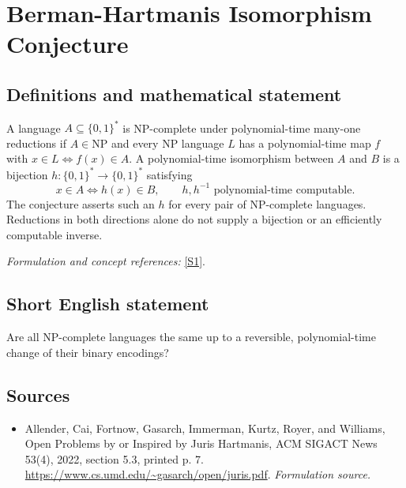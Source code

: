 \documentclass[11pt]{article}
\begin{document}
\section*{\texorpdfstring{Berman-Hartmanis Isomorphism Conjecture}{Berman-Hartmanis Isomorphism Conjecture}}\label{statement}
\subsection{Definitions and mathematical statement}
A language $A\subseteq\{0,1\}^*$ is NP-complete under polynomial-time many-one reductions if $A\in\mathrm{NP}$ and every NP language $L$ has a polynomial-time map $f$ with $x\in L\iff f(x)\in A$. A polynomial-time isomorphism between $A$ and $B$ is a bijection $h:\{0,1\}^*\to\{0,1\}^*$ satisfying
\[
 x\in A\iff h(x)\in B,
 \qquad h,h^{-1}\text{ polynomial-time computable}.
\]
The conjecture asserts such an $h$ for every pair of NP-complete languages. Reductions in both directions alone do not supply a bijection or an efficiently computable inverse.
\par\smallskip\textit{Formulation and concept references:} \href{https://www.cs.umd.edu/~gasarch/open/juris.pdf}{[S1]}.

\subsection{Short English statement}
Are all NP-complete languages the same up to a reversible, polynomial-time change of their binary encodings?
\subsection{Sources}
\begin{itemize}
\item[S1]Allender, Cai, Fortnow, Gasarch, Immerman, Kurtz, Royer, and Williams, Open Problems by or Inspired by Juris Hartmanis, ACM SIGACT News 53(4), 2022, section 5.3, printed p. 7.
\url{https://www.cs.umd.edu/~gasarch/open/juris.pdf}.
\textit{Formulation source.}
\end{itemize}
\end{document}
